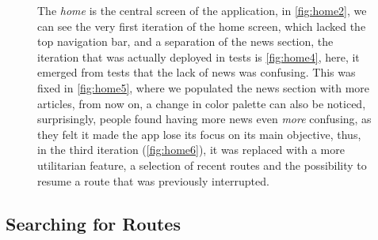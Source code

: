 \documentclass[a4paper, 11pt]{report}
\begin{document}
\begin{figure}[H]
{	}\hspace{0.5pt}
	\caption{The \emph{home} is the central screen of the application, in \cref{fig:home2},
		we can see the very first iteration of the home screen, which lacked the top navigation bar, and a separation
		of the news section, the iteration that was actually deployed in tests is \cref{fig:home4}, here, it emerged
		from tests that the lack of news was confusing. This was fixed in \cref{fig:home5}, where we populated the
		news section with more articles, from now on, a change in color palette can also be noticed, surprisingly,
		people found having more news even \emph{more} confusing, as they felt it made the app lose its focus on
		its main objective, thus, in the third iteration (\cref{fig:home6}), it was replaced with a
		more utilitarian feature, a selection of recent routes and the possibility to resume a route that was previously interrupted.}\label{fig:home}
\end{figure}

\subsection{Searching for Routes}\label{ssec:searching-for-routes}
\end{document}
